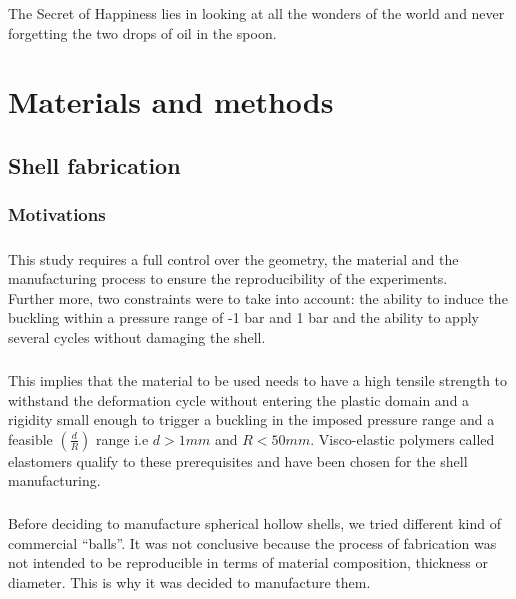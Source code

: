 \begin{savequote}
The Secret of Happiness lies in looking at all the wonders of the world and never forgetting the two drops of oil in the spoon.
\end{savequote}

\chapter{Materials and methods}
\newpage
\section{Shell fabrication}
\subsection{Motivations}
\paragraph{}
This study requires a full control over the geometry, the material and the manufacturing process to ensure the reproducibility of the experiments.\\
Further more, two constraints were to take into account: the ability to induce the buckling within a pressure range of -1 bar and 1 bar and the ability to apply several cycles without damaging the shell. 
\paragraph{}This implies that the material to be used needs to have a high tensile strength to withstand the deformation cycle without entering the plastic domain and a rigidity small enough to trigger a buckling in the imposed pressure range and a feasible $(\frac{d}{R})$ range i.e $d > 1 mm$ and $R < 50 mm$. Visco-elastic polymers called elastomers qualify to these prerequisites and have been chosen for the shell manufacturing.
\paragraph{}
Before deciding to manufacture spherical hollow shells, we tried different kind of commercial "`balls"'. It was not conclusive because the process of fabrication was not intended to be reproducible in terms of material composition, thickness or diameter. This is why it was decided to manufacture them.
